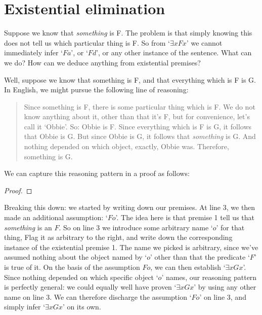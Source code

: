 \section{Existential elimination}
Suppose we know that \emph{something} is F. The problem is that simply knowing this does not tell us which particular thing is F. So from `$\exists x Fx$' we cannot immediately infer `$Fa$', or `$Fd$', or any other instance of the sentence. What can we do?  How can we deduce anything from existential premises?

Well, suppose we know that something is F, and that everything which is F is G. In English, we might pursue the following line of reasoning:
	\begin{quote}
		Since something is F, there is some particular thing which is F. We do not know anything about it, other than that it's F, but for convenience, let's call it `Obbie'. So: Obbie is F. Since everything which is F is G, it follows that Obbie is G. But since Obbie is G, it follows that \emph{something} is G. And nothing depended on which object, exactly, Obbie was. Therefore, something is G.
	\end{quote}
We can capture this reasoning pattern in a proof as follows:
\begin{proof}
	 
	 
	\open
		 
		 
	\close
\end{proof}\noindent
Breaking this down: we started by writing down our premises. At line 3, we then made an additional assumption: `$Fo$'. The idea here is that premise 1 tell us that \emph{something} is an $F$.  So on line 3 we introduce some arbitrary name `$o$' for that thing, Flag it as arbitrary to the right, and write down the corresponding instance of the existential premise 1.    The name we picked is arbitrary, since we've assumed nothing about the object named by `$o$' other than that the predicate `$F$' is true of it.  On the basis of the assumption $Fo$, we can then establish `$\exists xGx$'.  Since nothing depended on which specific object `$o$' names, our reasoning pattern is perfectly general: we could equally well have proven `$\exists xGx$'  by using any other name on line 3. We can therefore discharge the assumption `$Fo$' on line 3, and simply infer `$\exists x Gx$' on its own.

